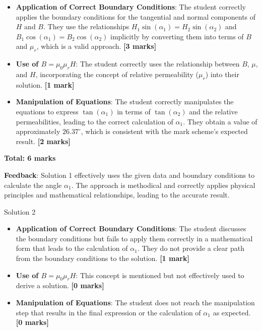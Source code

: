 \documentclass[a4paper,11pt]{article}
\begin{document}
\begin{itemize}
    \item \textbf{Application of Correct Boundary Conditions}: The student correctly applies the boundary conditions for the tangential and normal components of \(H\) and \(B\). They use the relationships \(H_1 \sin(\alpha_1) = H_2 \sin(\alpha_2)\) and \(B_1 \cos(\alpha_1) = B_2 \cos(\alpha_2)\) implicitly by converting them into terms of \(B\) and \(\mu_r\), which is a valid approach. \textbf{[3 marks]}
    \item \textbf{Use of \( B = \mu_0 \mu_r H \)}: The student correctly uses the relationship between \(B\), \(\mu\), and \(H\), incorporating the concept of relative permeability (\(\mu_r\)) into their solution. \textbf{[1 mark]}
    \item \textbf{Manipulation of Equations}: The student correctly manipulates the equations to express \(\tan(\alpha_1)\) in terms of \(\tan(\alpha_2)\) and the relative permeabilities, leading to the correct calculation of \(\alpha_1\). They obtain a value of approximately \(26.37^\circ\), which is consistent with the mark scheme's expected result. \textbf{[2 marks]}
\end{itemize}

\textbf{Total: 6 marks}

\textbf{Feedback}: Solution 1 effectively uses the given data and boundary conditions to calculate the angle \( \alpha_{1} \). The approach is methodical and correctly applies physical principles and mathematical relationships, leading to the accurate result.

Solution 2

\begin{itemize}
    \item \textbf{Application of Correct Boundary Conditions}: The student discusses the boundary conditions but fails to apply them correctly in a mathematical form that leads to the calculation of \( \alpha_{1} \). They do not provide a clear path from the boundary conditions to the solution. \textbf{[1 mark]}
    \item \textbf{Use of \( B = \mu_0 \mu_r H \)}: This concept is mentioned but not effectively used to derive a solution. \textbf{[0 marks]}
    \item \textbf{Manipulation of Equations}: The student does not reach the manipulation step that results in the final expression or the calculation of \( \alpha_{1} \) as expected. \textbf{[0 marks]}
\end{itemize}
\end{document}

